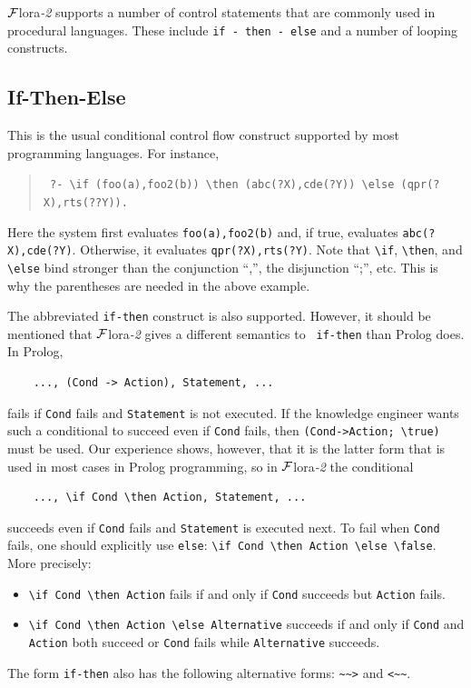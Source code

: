 \documentclass[11pt]{article}
\newcommand{\FLORA}{{\mbox{\sc ${\cal F}${lora}\rm\emph{-2}}}\xspace}
\newcommand{\FLSYSTEM}{\FLORA}
\newcommand{\rnafarr}{\texttt{\textasciitilde\textasciitilde>}}
\newcommand{\lnafarr}{\texttt{<\textasciitilde\textasciitilde}}
\newcommand{\bs}{\textbackslash}
\begin{document}
\FLSYSTEM supports a number of control statements that are commonly used in
procedural languages. These include {\tt if - then - else} and 
a number of looping constructs.

\subsection{If-Then-Else}
This is the usual conditional control flow
construct supported by most programming languages.  For instance,
\begin{quote}
 \tt
       ?- \bs{}if (foo(a),foo2(b)) \bs{}then (abc(?X),cde(?Y)) \bs{}else (qpr(?X),rts(??Y)).
\end{quote}
Here the system first evaluates {\tt foo(a),foo2(b)} and, if true,
evaluates {\tt abc(?X),cde(?Y)}. Otherwise, it evaluates {\tt qpr(?X),rts(?Y)}.
Note that {\tt \bs{}if}, {\tt \bs{}then}, and {\tt \bs{}else}
bind stronger than the conjunction ``,'', the
disjunction ``;'', etc. This is why the parentheses are needed in the above
example.


The abbreviated {\tt if-then} construct is also supported.  However, it
should be mentioned that \FLSYSTEM gives a different semantics to {\tt
  if-then} than Prolog does. In Prolog,
\begin{verbatim}
    ..., (Cond -> Action), Statement, ...  
\end{verbatim}
fails if {\tt Cond} fails and {\tt Statement} is not executed. If the
knowledge engineer
wants such a conditional to succeed even if {\tt Cond} fails, then
{\tt (Cond->Action; \bs{}true)} must be used. Our experience shows, however,
that it is the latter form that is used in most cases in Prolog
programming, so in \FLSYSTEM the conditional
\begin{verbatim}
    ..., \if Cond \then Action, Statement, ...  
\end{verbatim}
succeeds even if {\tt Cond} fails and {\tt Statement} is executed next. To
fail when {\tt Cond} fails, one should explicitly use {\tt else}:
{\tt \bs{}if Cond \bs{}then Action \bs{}else \bs{}false}. More precisely:
\begin{itemize}
  \item  {\tt \bs{}if Cond \bs{}then Action} fails if and only if {\tt Cond} succeeds
    but {\tt Action} fails.
  \item {\tt \bs{}if Cond \bs{}then Action \bs{}else Alternative} succeeds if and only if 
    {\tt Cond} and {\tt Action} both succeed or {\tt Cond} fails while
    {\tt Alternative} succeeds.
\end{itemize}
\index{\rnafarr}
\index{\lnafarr}
The form {\tt if-then} also has the following alternative forms: \rnafarr
and \lnafarr.
\end{document}
